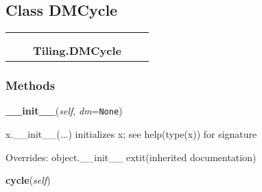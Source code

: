 \subsection{Class DMCycle}

    \label{Tiling:DMCycle}
\begin{tabular}{cccccc}
\multicolumn{2}{r}{\settowidth{\BCL}{object}\multirow{2}{\BCL}{object}}
&&
  \\\cline{3-3}
  &&\multicolumn{1}{c|}{}
&&
  \\
&&\multicolumn{2}{l}{\textbf{Tiling.DMCycle}}
\end{tabular}



  \subsubsection{Methods}

    \vspace{0.5ex}

\hspace{.8\funcindent}\begin{boxedminipage}{\funcwidth}

    \raggedright \textbf{\_\_init\_\_}(\textit{self}, \textit{dm}={\tt None})

\setlength{\parskip}{2ex}
    x.\_\_init\_\_(...) initializes x; see help(type(x)) for signature

\setlength{\parskip}{1ex}
      Overrides: object.\_\_init\_\_ 	extit{(inherited documentation)}

    \end{boxedminipage}

    \label{Tiling:DMCycle:cycle}

    \vspace{0.5ex}

\hspace{.8\funcindent}\begin{boxedminipage}{\funcwidth}

    \raggedright \textbf{cycle}(\textit{self})

\setlength{\parskip}{2ex}
\setlength{\parskip}{1ex}
    \end{boxedminipage}


